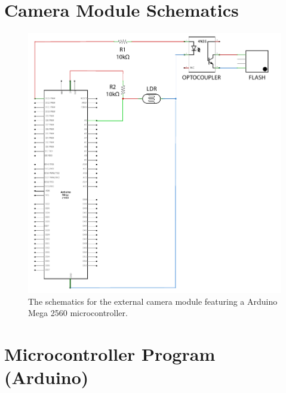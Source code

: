 \documentclass[thesis.tex]{subfiles}
\begin{document}
\chapter{Camera Module Schematics}
\label{appendix:camera-module-schematics}

\begin{figure}[h]
\centering \includegraphics[width=11.75cm]{images/design_implementation/arduino_schematics.pdf}
\caption{The schematics for the external camera module featuring a Arduino Mega 2560 microcontroller.}
\end{figure}

\chapter{Microcontroller Program (Arduino)}
\label{appendix:microcontroller-program}




\end{document}
